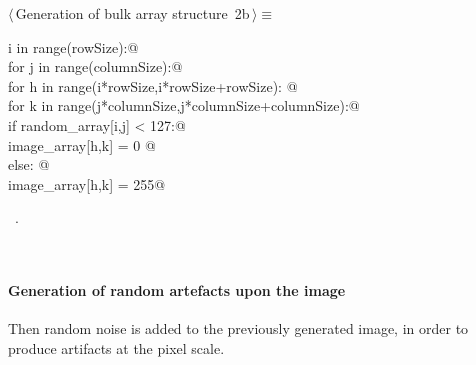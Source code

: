\documentclass[11pt,oneside]{article}	%
\begin{document}
%
%
%
	
\begin{flushleft} \small
\begin{minipage}{\linewidth} \label{scrap2}
\protect{}$\langle\,$Generation of bulk array structure\nobreak\ {\footnotesize 2b}$\,\rangle\equiv$
\vspace{-1ex}
\begin{list}{}{} \item
\mbox{}\verb@for i in range(rowSize):@\\
\mbox{}\verb@   for j in range(columnSize):@\\
\mbox{}\verb@      for h in range(i*rowSize,i*rowSize+rowSize): @\\
\mbox{}\verb@         for k in range(j*columnSize,j*columnSize+columnSize):@\\
\mbox{}\verb@            if random_array[i,j] < 127:@\\
\mbox{}\verb@               image_array[h,k] = 0 @\\
\mbox{}\verb@            else: @\\
\mbox{}\verb@               image_array[h,k] = 255@\\
\mbox{}\verb@@{\NWsep}
\end{list}
\vspace{-1ex}
\footnotesize\addtolength{\baselineskip}{-1ex}
\begin{list}{}{\setlength{\itemsep}{-\parsep}\setlength{\itemindent}{-\leftmargin}}
\item \NWtxtMacroRefIn\ .
\end{list}
\end{minipage}\\[4ex]
\end{flushleft}

\paragraph{Generation of random artefacts upon the image}

Then random noise is added to the previously generated image, in order to produce artifacts at the pixel scale. 
\end{document}
